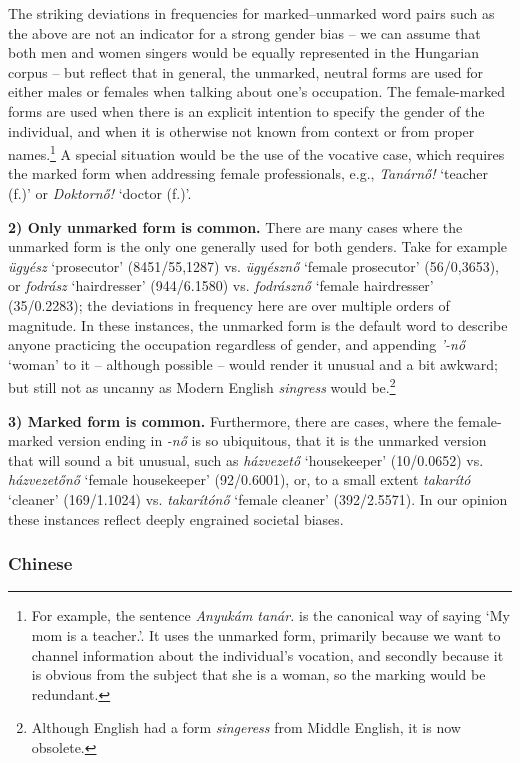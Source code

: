 \documentclass[11pt]{article}
\begin{document}
The striking deviations in frequencies for marked--unmarked word pairs such as the above are not an indicator for a strong gender bias -- we can assume that both men and women singers would be equally represented in the Hungarian corpus -- but reflect that in general, the unmarked, neutral forms are used for either males or females when talking about one's occupation. The female-marked forms are used when there is an explicit intention to specify the gender of the individual, and when it is otherwise not known from context or from proper names.\footnote{For example, the sentence \textit{Anyukám tanár.} is the canonical way of saying `My mom is a teacher.'. It uses the unmarked form, primarily because we want to channel information about the individual's vocation, and secondly because it is obvious from the subject that she is a woman, so the marking would be redundant.} A special situation would be the use of the vocative case, which requires the marked form when addressing female professionals, e.g., \textit{Tanárnő!} `teacher (f.)' or \textit{Doktornő!} `doctor (f.)'.

\textbf{2) Only unmarked form is common.} There are many cases where the unmarked form is the only one generally used for both genders. Take for example \textit{ügyész} `prosecutor' (8451/55,1287) vs. \textit{ügyésznő} `female prosecutor' (56/0,3653), or \textit{fodrász} `hairdresser' (944/6.1580) vs. \textit{fodrásznő} `female hairdresser' (35/0.2283); the deviations in frequency here are over multiple orders of magnitude. In these instances, the unmarked form is the default word to describe anyone practicing the occupation regardless of gender, and appending \textit{'-nő} `woman' to it -- although possible -- would render it unusual and a bit awkward; but still not as uncanny as Modern English \textit{singress} would be.\footnote{Although English had a form \textit{singeress} from Middle English, it is now obsolete.}

\textbf{3) Marked form is common.} Furthermore, there are cases, where the female-marked version ending in \textit{-nő} is so ubiquitous, that it is the unmarked version that will sound a bit unusual, such as \textit{házvezető} `housekeeper' (10/0.0652) vs. \textit{házvezetőnő} `female housekeeper' (92/0.6001), or, to a small extent \textit{takarító} `cleaner' (169/1.1024) vs. \textit{takarítónő} `female cleaner' (392/2.5571). In our opinion these instances reflect deeply engrained societal biases.

\subsubsection{Chinese}
\end{document}
